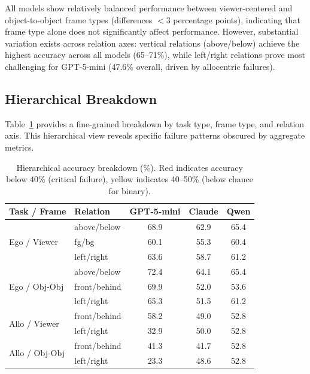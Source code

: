 All models show relatively balanced performance between viewer-centered and object-to-object frame types (differences $<$3 percentage points), indicating that frame type alone does not significantly affect performance. However, substantial variation exists across relation axes: vertical relations (above/below) achieve the highest accuracy across all models (65--71\%), while left/right relations prove most challenging for GPT-5-mini (47.6\% overall, driven by allocentric failures).

\subsection{Hierarchical Breakdown}

Table~\ref{tab:hierarchical} provides a fine-grained breakdown by task type, frame type, and relation axis. This hierarchical view reveals specific failure patterns obscured by aggregate metrics.

\begin{table}[h]
\centering
\small
\caption{Hierarchical accuracy breakdown (\%). \colorbox{red!15}{Red} indicates accuracy below 40\% (critical failure), \colorbox{yellow!25}{yellow} indicates 40--50\% (below chance for binary).}
\label{tab:hierarchical}
\setlength{\tabcolsep}{3.5pt}
\begin{tabular}{@{}ll|ccc@{}}
\toprule
\textbf{Task / Frame} & \textbf{Relation} & \textbf{GPT-5-mini} & \textbf{Claude} & \textbf{Qwen} \\
\midrule
\multirow{3}{*}{Ego / Viewer}
    & above/below & 68.9 & 62.9 & 65.4 \\
    & fg/bg & 60.1 & 55.3 & 60.4 \\
    & left/right & 63.6 & 58.7 & 61.2 \\
\midrule
\multirow{3}{*}{Ego / Obj-Obj}
    & above/below & 72.4 & 64.1 & 65.4 \\
    & front/behind & 69.9 & 52.0 & 53.6 \\
    & left/right & 65.3 & 51.5 & 61.2 \\
\midrule
\multirow{2}{*}{Allo / Viewer}
    & front/behind & 58.2 & \cellcolor{yellow!25}49.0 & 52.8 \\
    & left/right & \cellcolor{red!15}32.9 & 50.0 & 52.8 \\
\midrule
\multirow{2}{*}{Allo / Obj-Obj}
    & front/behind & \cellcolor{yellow!25}41.3 & \cellcolor{yellow!25}41.7 & 52.8 \\
    & left/right & \cellcolor{red!15}23.3 & \cellcolor{yellow!25}48.6 & 52.8 \\
\bottomrule
\end{tabular}
\end{table}

